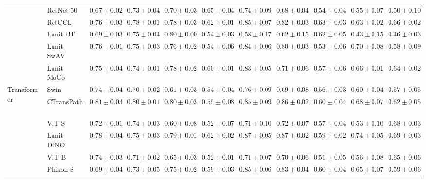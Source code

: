 \begin{tabular}{ll|cccc|c|cccc}
 & ResNet-50~\cite{he2015deep} & $0.67 \pm 0.02$ & $0.73 \pm 0.04$ & $0.70 \pm 0.03$ & $\mathbf{0.65 \pm 0.04}$ & $0.74 \pm 0.09$ & $0.68 \pm 0.04$ & $0.54 \pm 0.04$ & $0.55 \pm 0.07$ & $0.50 \pm 0.10$ \\
 & RetCCL~\cite{wang2023retccl} & $0.76 \pm 0.03$ & $0.78 \pm 0.01$ & $0.78 \pm 0.03$ & $0.62 \pm 0.01$ & $0.85 \pm 0.07$ & $0.82 \pm 0.03$ & $\mathbf{0.63 \pm 0.03}$ & $0.63 \pm 0.02$ & $0.66 \pm 0.02$ \\
 & Lunit-BT~\cite{kang2023benchmarking} & $0.69 \pm 0.03$ & $0.75 \pm 0.04$ & $0.80 \pm 0.00$ & $0.54 \pm 0.03$ & $0.58 \pm 0.17$ & $0.62 \pm 0.15$ & $0.62 \pm 0.05$ & $0.43 \pm 0.15$ & $0.46 \pm 0.03$ \\
 & Lunit-SwAV~\cite{kang2023benchmarking} & $0.76 \pm 0.01$ & $0.75 \pm 0.03$ & $0.76 \pm 0.02$ & $0.54 \pm 0.06$ & $0.84 \pm 0.06$ & $0.80 \pm 0.03$ & $0.53 \pm 0.06$ & $0.70 \pm 0.08$ & $0.58 \pm 0.09$ \\
 & Lunit-MoCo~\cite{kang2023benchmarking} & $0.75 \pm 0.04$ & $0.74 \pm 0.01$ & $0.78 \pm 0.02$ & $0.60 \pm 0.01$ & $0.83 \pm 0.05$ & $0.71 \pm 0.06$ & $0.57 \pm 0.06$ & $0.66 \pm 0.01$ & $0.64 \pm 0.02$ \\
\cline{1-11}
\multirow[t]{14}{*}{Transformer} & Swin~\cite{liu2021swin} & $0.74 \pm 0.04$ & $0.70 \pm 0.02$ & $0.61 \pm 0.03$ & $0.54 \pm 0.04$ & $0.76 \pm 0.09$ & $0.69 \pm 0.08$ & $0.56 \pm 0.03$ & $0.60 \pm 0.04$ & $0.57 \pm 0.05$ \\
 & CTransPath~\cite{wang2022transformer} & $0.81 \pm 0.03$ & $\mathbf{0.80 \pm 0.01}$ & $0.80 \pm 0.03$ & $0.55 \pm 0.08$ & $0.85 \pm 0.09$ & $0.86 \pm 0.02$ & $0.60 \pm 0.04$ & $0.68 \pm 0.07$ & $0.62 \pm 0.05$ \\
 & ViT-S~\cite{kolesnikov2021image} & $0.72 \pm 0.01$ & $0.74 \pm 0.03$ & $0.60 \pm 0.08$ & $0.52 \pm 0.07$ & $0.71 \pm 0.10$ & $0.72 \pm 0.07$ & $0.57 \pm 0.04$ & $0.53 \pm 0.10$ & $0.68 \pm 0.03$ \\
 & Lunit-DINO~\cite{kang2023benchmarking} & $0.78 \pm 0.04$ & $0.75 \pm 0.03$ & $0.79 \pm 0.01$ & $\mathbf{0.62 \pm 0.02}$ & $0.87 \pm 0.05$ & $\mathbf{0.87 \pm 0.02}$ & $0.59 \pm 0.02$ & $\mathbf{0.74 \pm 0.05}$ & $\mathbf{0.69 \pm 0.03}$ \\
 & ViT-B~\cite{kolesnikov2021image} & $0.74 \pm 0.03$ & $0.71 \pm 0.02$ & $0.65 \pm 0.03$ & $0.52 \pm 0.01$ & $0.71 \pm 0.07$ & $0.70 \pm 0.06$ & $0.51 \pm 0.05$ & $0.56 \pm 0.08$ & $0.65 \pm 0.06$ \\
 & Phikon-S~\cite{filiot2023scaling} & $0.69 \pm 0.04$ & $0.73 \pm 0.05$ & $0.75 \pm 0.02$ & $0.59 \pm 0.03$ & $0.85 \pm 0.06$ & $0.83 \pm 0.04$ & $0.60 \pm 0.04$ & $0.65 \pm 0.07$ & $0.59 \pm 0.06$ \\

\end{tabular}
